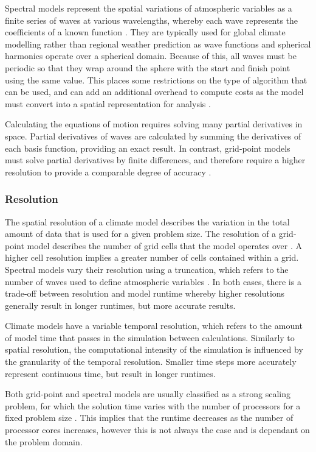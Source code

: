 \documentclass[a4paper,11pt]{report}
\begin{document}
\par
Spectral models represent the spatial variations of atmospheric variables as a finite series of waves at various wavelengths, whereby each wave represents the coefficients of a known function \cite{bourke1988spectral}. They are typically used for global climate modelling rather than regional weather prediction as wave functions and spherical harmonics operate over a spherical domain. Because of this, all waves must be periodic so that they wrap around the sphere with the start and finish point using the same value. This places some restrictions on the type of algorithm that can be used, and can add an additional overhead to compute costs as the model must convert into a spatial representation for analysis \cite{orszag1974fourier}. 
\par
Calculating the equations of motion requires solving many partial derivatives in space. Partial derivatives of waves are calculated by summing the derivatives of each basis function, providing an exact result. In contrast, grid-point models must solve partial derivatives by finite differences, and therefore require a higher resolution to provide a comparable degree of accuracy \cite{bart1998coordinate}. 

\subsubsection{Resolution} 
The spatial resolution of a climate model describes the variation in the total amount of data that is used for a given problem size. The resolution of a grid-point model describes the number of grid cells that the model operates over \cite{goosse2010introduction}. A higher cell resolution implies a greater number of cells contained within a grid. Spectral models vary their resolution using a truncation, which refers to the number of waves used to define atmospheric variables \cite{goosse2010introduction}. In both cases, there is a trade-off between resolution and model runtime whereby higher resolutions generally result in longer runtimes, but more accurate results. 
\par
Climate models have a variable temporal resolution, which refers to the amount of model time that passes in the simulation between calculations. Similarly to spatial resolution, the computational intensity of the simulation is influenced by the granularity of the temporal resolution. Smaller time steps more accurately represent continuous time, but result in longer runtimes.
\par
Both grid-point and spectral models are usually classified as a strong scaling problem, for which the solution time varies with the number of processors for a fixed problem size \cite{colella2007performance}. This implies that the runtime decreases as the number of processor cores increases, however this is not always the case and is dependant on the problem domain.
\end{document}
